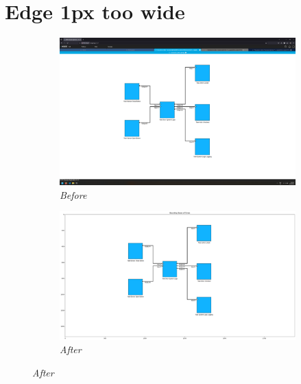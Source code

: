 \documentclass{article}
\begin{document}
\section{Edge 1px too wide}
\begin{figure}[H]
    \centering
    \begin{subfigure}[t]{0.9\textwidth}
        \centering
        \includegraphics[width=\textwidth]{testcases/edge_1px_too_wide/143815-341162_input_image.png}
        \caption*{\textit{Before}}
    \end{subfigure}
    \newline    
    \begin{subfigure}[t]{0.9\textwidth}
        \centering
        \includegraphics[width=\textwidth]{testcases/edge_1px_too_wide/143838-662391_element_bbox_errors_labeled_colored.png}
        \caption*{\textit{After}}
    \end{subfigure}
    \label{fig:edge_too_wide_1}
\end{figure}
\newpage
\end{document}
